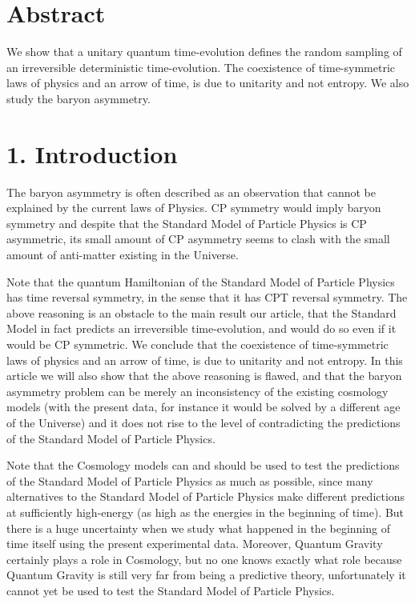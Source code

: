 \documentclass[11pt]{book}
\begin{document}
\section*{Abstract}
We show that a unitary quantum time-evolution defines the random
sampling of an irreversible deterministic time-evolution. The
coexistence of time-symmetric laws of physics and an arrow of time, is
due to unitarity and not entropy. We also study the baryon asymmetry.


\hypertarget{introduction}{%
\section{1. Introduction}\label{introduction}}

The baryon asymmetry is often described as an observation that cannot be
explained by the current laws of Physics. CP symmetry would imply baryon
symmetry and despite that the Standard Model of Particle Physics is CP
asymmetric, its small amount of CP asymmetry seems to clash with the
small amount of anti-matter existing in the Universe.

Note that the quantum Hamiltonian of the Standard Model of Particle
Physics has time reversal symmetry, in the sense that it has CPT
reversal symmetry. The above reasoning is an obstacle to the main result
our article, that the Standard Model in fact predicts an irreversible
time-evolution, and would do so even if it would be CP symmetric. We
conclude that the coexistence of time-symmetric laws of physics and an
arrow of time, is due to unitarity and not entropy. In this article we
will also show that the above reasoning is flawed, and that the baryon
asymmetry problem can be merely an inconsistency of the existing
cosmology models (with the present data, for instance it would be solved
by a different age of the Universe) and it does not rise to the level of
contradicting the predictions of the Standard Model of Particle Physics.

Note that the Cosmology models can and should be used to test the
predictions of the Standard Model of Particle Physics as much as
possible, since many alternatives to the Standard Model of Particle
Physics make different predictions at sufficiently high-energy (as high
as the energies in the beginning of time). But there is a huge
uncertainty when we study what happened in the beginning of time itself
using the present experimental data. Moreover, Quantum Gravity certainly
plays a role in Cosmology, but no one knows exactly what role because
Quantum Gravity is still very far from being a predictive theory,
unfortunately it cannot yet be used to test the Standard Model of
Particle Physics.
\end{document}
